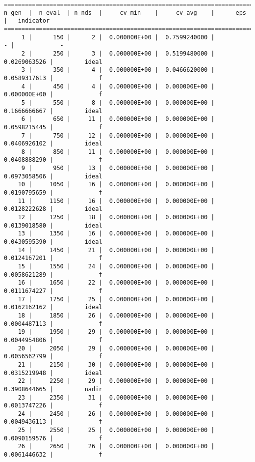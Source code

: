 \documentclass[
  letterpaper,
  DIV=11,
  numbers=noendperiod]{scrartcl}
\begin{document}
\begin{verbatim}
==========================================================================================
n_gen  |  n_eval  | n_nds  |     cv_min    |     cv_avg    |      eps      |   indicator  
==========================================================================================
     1 |      150 |      2 |  0.000000E+00 |  0.7599240000 |             - |             -
     2 |      250 |      3 |  0.000000E+00 |  0.5199480000 |  0.0269063526 |         ideal
     3 |      350 |      4 |  0.000000E+00 |  0.0466620000 |  0.0589317613 |             f
     4 |      450 |      4 |  0.000000E+00 |  0.000000E+00 |  0.000000E+00 |             f
     5 |      550 |      8 |  0.000000E+00 |  0.000000E+00 |  0.1666666667 |         ideal
     6 |      650 |     11 |  0.000000E+00 |  0.000000E+00 |  0.0598215445 |             f
     7 |      750 |     12 |  0.000000E+00 |  0.000000E+00 |  0.0406926102 |         ideal
     8 |      850 |     11 |  0.000000E+00 |  0.000000E+00 |  0.0408888290 |             f
     9 |      950 |     13 |  0.000000E+00 |  0.000000E+00 |  0.0973058506 |         ideal
    10 |     1050 |     16 |  0.000000E+00 |  0.000000E+00 |  0.0190795659 |             f
    11 |     1150 |     16 |  0.000000E+00 |  0.000000E+00 |  0.0128222628 |         ideal
    12 |     1250 |     18 |  0.000000E+00 |  0.000000E+00 |  0.0139018580 |         ideal
    13 |     1350 |     16 |  0.000000E+00 |  0.000000E+00 |  0.0430595390 |         ideal
    14 |     1450 |     21 |  0.000000E+00 |  0.000000E+00 |  0.0124167201 |             f
    15 |     1550 |     24 |  0.000000E+00 |  0.000000E+00 |  0.0058621289 |             f
    16 |     1650 |     22 |  0.000000E+00 |  0.000000E+00 |  0.0111674227 |             f
    17 |     1750 |     25 |  0.000000E+00 |  0.000000E+00 |  0.0162162162 |         ideal
    18 |     1850 |     26 |  0.000000E+00 |  0.000000E+00 |  0.0004487113 |             f
    19 |     1950 |     29 |  0.000000E+00 |  0.000000E+00 |  0.0044954806 |             f
    20 |     2050 |     29 |  0.000000E+00 |  0.000000E+00 |  0.0056562799 |             f
    21 |     2150 |     30 |  0.000000E+00 |  0.000000E+00 |  0.0315219948 |         ideal
    22 |     2250 |     29 |  0.000000E+00 |  0.000000E+00 |  0.3908644665 |         nadir
    23 |     2350 |     31 |  0.000000E+00 |  0.000000E+00 |  0.0013747226 |             f
    24 |     2450 |     26 |  0.000000E+00 |  0.000000E+00 |  0.0049436113 |             f
    25 |     2550 |     25 |  0.000000E+00 |  0.000000E+00 |  0.0090159576 |             f
    26 |     2650 |     26 |  0.000000E+00 |  0.000000E+00 |  0.0061446632 |             f
\end{verbatim}
\end{document}
